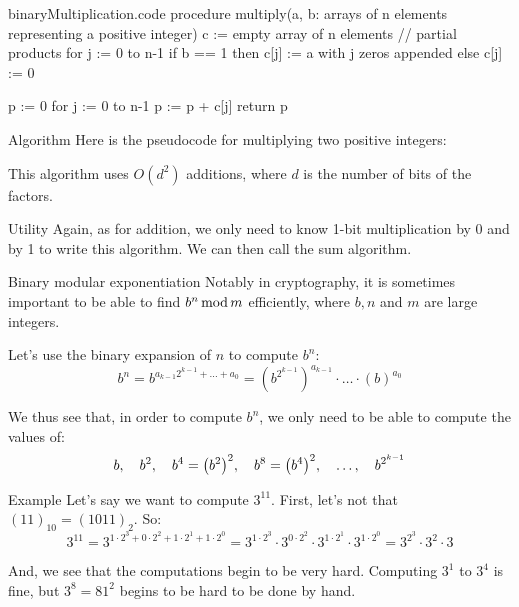 \documentclass[a4paper]{article}
\begin{document}
\begin{filecontents*}[overwrite]{binaryMultiplication.code}
procedure multiply(a, b: arrays of n elements representing a positive integer)
    c := empty array of n elements  // partial products
    for j := 0 to n-1
        if b == 1 then c[j] := a with j zeros appended
        else c[j] := 0

    p := 0
    for j := 0 to n-1
        p := p + c[j]
    return p
\end{filecontents*}

\begin{parag}{Algorithm}
    Here is the pseudocode for multiplying two positive integers:
    
    This algorithm uses $O\left(d^2\right)$ additions, where $d$ is the number of bits of the factors.

    \begin{subparag}{Utility}
        Again, as for addition, we only need to know 1-bit multiplication by 0 and by 1 to write this algorithm. We can then call the sum algorithm.
    \end{subparag}
\end{parag}

\begin{parag}{Binary modular exponentiation}
    Notably in cryptography, it is sometimes important to be able to find $b^n \operatorname{mod} m$ efficiently, where $b, n$ and $m$ are large integers.

    Let's use the binary expansion of $n$ to compute $b^n$:
    \[b^{n} = b^{a_{k-1} 2^{k-1} + \ldots + a_0} = \left(b^{2^{k-1}}\right)^{a_{k-1}} \cdot \ldots \cdot \left(b\right)^{a_0}\]

    We thus see that, in order to compute $b^n$, we only need to be able to compute the values of: 
    \[b, \mathspace b^2, \mathspace b^4 = \left(b^2\right)^2, \mathspace b^8 = \left(b^4\right)^2, \mathspace \ldots, \mathspace b^{2^{k-1}}\]
\end{parag}

\begin{parag}{Example}
    Let's say we want to compute $3^{11}$. First, let's not that $\left(11\right)_{10} = \left(1011\right)_2$. So: 
    \[3^{11} = 3^{1\cdot 2^{3} + 0\cdot 2^2 + 1\cdot 2^1 + 1\cdot 2^0} = 3^{1\cdot 2^3}\cdot 3^{0\cdot 2^2}\cdot 3^{1\cdot 2^1}\cdot 3^{1\cdot 2^0} = 3^{2^3} \cdot 3^{2} \cdot 3\]
    
    And, we see that the computations begin to be very hard. Computing $3^1$ to $3^4$ is fine, but $3^8 = 81^2$ begins to be hard to be done by hand.
\end{parag}
\end{document}
